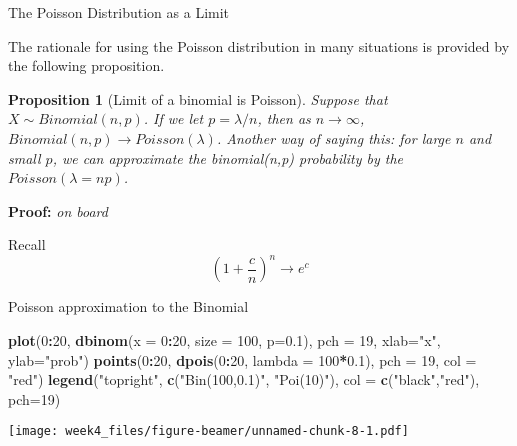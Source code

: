 \documentclass[12pt,ignorenonframetext,compress]{beamer}
\newenvironment{Shaded}{\begin{snugshade}}{\end{snugshade}}
\newcommand{\KeywordTok}[1]{\textcolor[rgb]{0.13,0.29,0.53}{\textbf{#1}}}
\newcommand{\DataTypeTok}[1]{\textcolor[rgb]{0.13,0.29,0.53}{#1}}
\newcommand{\DecValTok}[1]{\textcolor[rgb]{0.00,0.00,0.81}{#1}}
\newcommand{\FloatTok}[1]{\textcolor[rgb]{0.00,0.00,0.81}{#1}}
\newcommand{\StringTok}[1]{\textcolor[rgb]{0.31,0.60,0.02}{#1}}
\newcommand{\OperatorTok}[1]{\textcolor[rgb]{0.81,0.36,0.00}{\textbf{#1}}}
\newcommand{\NormalTok}[1]{#1}
\let\oldShaded\Shaded
\let\endoldShaded\endShaded
\renewenvironment{Shaded}{\scriptsize\oldShaded}{\endoldShaded}
\newtheorem{proposition}[theorem]{Proposition}
\begin{document}
\begin{frame}{The Poisson Distribution as a Limit}

The rationale for using the Poisson distribution in many situations is
provided by the following proposition.

\begin{proposition}[Limit of a binomial is Poisson]
Suppose that $X \sim Binomial(n,p)$. If we let $p = \lambda/n$, then as $n \rightarrow \infty$, $Binomial(n,p) \rightarrow Poisson(\lambda)$. Another way of saying this: for large $n$ and small $p$, we can approximate the binomial(n,p) probability by the $Poisson(\lambda = np)$. 
\end{proposition}

\textbf{Proof:} \emph{on board}

Recall \[\left(1 + \frac{c}{n} \right)^n \rightarrow e^c\]

\end{frame}

\begin{frame}[fragile]{Poisson approximation to the Binomial}

\begin{Shaded}
\begin{Highlighting}[]
\KeywordTok{plot}\NormalTok{(}\DecValTok{0}\OperatorTok{:}\DecValTok{20}\NormalTok{, }\KeywordTok{dbinom}\NormalTok{(}\DataTypeTok{x =} \DecValTok{0}\OperatorTok{:}\DecValTok{20}\NormalTok{, }\DataTypeTok{size =} \DecValTok{100}\NormalTok{, }\DataTypeTok{p=}\FloatTok{0.1}\NormalTok{), }\DataTypeTok{pch =} \DecValTok{19}\NormalTok{, }\DataTypeTok{xlab=}\StringTok{"x"}\NormalTok{, }\DataTypeTok{ylab=}\StringTok{"prob"}\NormalTok{)}
\KeywordTok{points}\NormalTok{(}\DecValTok{0}\OperatorTok{:}\DecValTok{20}\NormalTok{, }\KeywordTok{dpois}\NormalTok{(}\DecValTok{0}\OperatorTok{:}\DecValTok{20}\NormalTok{, }\DataTypeTok{lambda =} \DecValTok{100}\OperatorTok{*}\FloatTok{0.1}\NormalTok{), }\DataTypeTok{pch =} \DecValTok{19}\NormalTok{, }\DataTypeTok{col =} \StringTok{"red"}\NormalTok{)}
\KeywordTok{legend}\NormalTok{(}\StringTok{"topright"}\NormalTok{, }\KeywordTok{c}\NormalTok{(}\StringTok{"Bin(100,0.1)"}\NormalTok{, }\StringTok{"Poi(10)"}\NormalTok{), }\DataTypeTok{col =} \KeywordTok{c}\NormalTok{(}\StringTok{"black"}\NormalTok{,}\StringTok{"red"}\NormalTok{), }\DataTypeTok{pch=}\DecValTok{19}\NormalTok{)}
\end{Highlighting}
\end{Shaded}

\texttt{[image: week4\_files/figure-beamer/unnamed-chunk-8-1.pdf]}

\end{frame}
\end{document}
